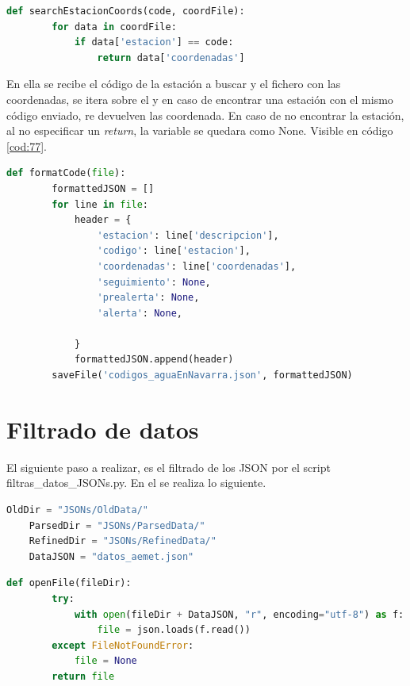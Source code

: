 \begin{lstlisting}[language=Python, caption={Declaración función \textit{searchEstacionCoords()}} usada para formatear los JSON de códigos en CHCantábrico y MeteoNavarra, label=cod:77]
	def searchEstacionCoords(code, coordFile):
		for data in coordFile:
			if data['estacion'] == code:
				return data['coordenadas']
\end{lstlisting}

En ella se recibe el código de la estación a buscar y el fichero con las coordenadas, se itera sobre el y en caso de encontrar una estación con el mismo código enviado, re devuelven las coordenada. En caso de no encontrar la estación, al no especificar un \textit{return}, la variable se quedara como None. Visible en código \ref{cod:77}.

\begin{lstlisting}[language=Python, caption={Declaración función \textit{formatCode()}}, label=cod:78]
	def formatCode(file):
		formattedJSON = []
		for line in file:
			header = {
				'estacion': line['descripcion'],
				'codigo': line['estacion'],
				'coordenadas': line['coordenadas'],
				'seguimiento': None,
				'prealerta': None,
				'alerta': None,
				
			}
			formattedJSON.append(header)
		saveFile('codigos_aguaEnNavarra.json', formattedJSON)
\end{lstlisting}

\section{Filtrado de datos}
El siguiente paso a realizar, es el filtrado de los JSON por el script filtras\_datos\_JSONs.py. En el se realiza lo siguiente.

\begin{lstlisting}[language=Python, caption={Declaración rutas JSONs y nombre de fichero}, label=cod:79]
	OldDir = "JSONs/OldData/"
	ParsedDir = "JSONs/ParsedData/"
	RefinedDir = "JSONs/RefinedData/"
	DataJSON = "datos_aemet.json"
\end{lstlisting}

\begin{lstlisting}[language=Python, caption={Declaración función openFile()}, label=cod:80]
	def openFile(fileDir):
		try:
			with open(fileDir + DataJSON, "r", encoding="utf-8") as f:
				file = json.loads(f.read())
		except FileNotFoundError:
			file = None
		return file
\end{lstlisting}

